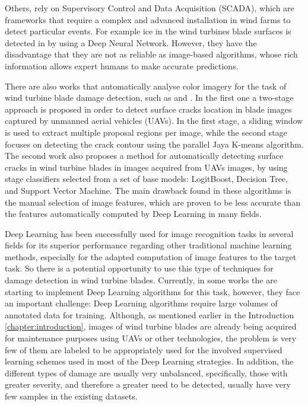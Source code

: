 Others, rely on Supervisory Control and Data Acquisition (SCADA), which are frameworks that require a complex and advanced installation in wind farms to detect particular events. For example ice in the wind turbines blade surfaces is detected in \cite{chen2018learning} by using a Deep Neural Network. However, they have the disadvantage that they are not as reliable as image-based algorithms, whose rich information allows expert humans to make accurate predictions.

There are also works that automatically analyse color imagery for the task of wind turbine blade damage detection, such as \cite{long2019two} and \cite{long2017automatic}. In the first one a two-stage approach is proposed in order to detect surface cracks location in blade images captured by unmanned aerial vehicles (UAVs). In the first stage, a sliding window is used to extract multiple proposal regions per image, while the second stage focuses on detecting the crack contour using the parallel Jaya K-means algorithm. The second work also proposes a method for automatically detecting surface cracks in wind turbine blades in images acquired from UAVs images, by using stage classifiers selected from a set of base models: LogitBoost, Decision Tree, and Support Vector Machine. The main drawback found in these algorithms is the manual selection of image features, which are proven to be less accurate than the features automatically computed by Deep Learning in many fields.

Deep Learning has been successfully used for image recognition tasks in several fields for its superior performance regarding other traditional machine learning methods, especially for the adapted computation of image features to the target task. So there is a potential opportunity to use this type of techniques for damage detection in wind turbine blades. Currently, in some works the are starting to implement Deep Learning algorithms for this task, however, they face an important challenge: Deep Learning algorithms require large volumes of annotated data for training. Although, as mentioned earlier in the Introduction \ref{chapter:introduction}, images of wind turbine blades are already being acquired for maintenance purposes using UAVs or other technologies, the problem is very few of them are labeled to be appropriately used for the involved supervised learning schemes used in most of the Deep Learning strategies. In addition, the different types of damage are usually very unbalanced, specifically, those with greater severity, and therefore a greater need to be detected, usually have very few samples in the existing datasets.

